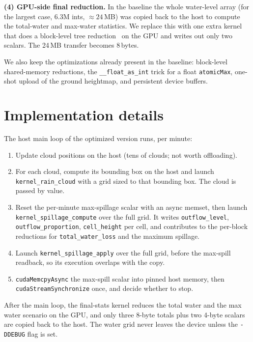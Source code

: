 \documentclass[sigconf, nonacm, review]{acmart}
\begin{document}
\textbf{(4) GPU-side final reduction.} In the baseline the
whole water-level array (for the largest case, 6.3M ints,
$\approx 24$\,MB) was copied back to the host to compute the
total-water and max-water statistics. We replace this with one
extra kernel that does a block-level tree
reduction~\cite{harris2007reduction} on the GPU and writes out
only two scalars. The 24\,MB transfer becomes 8\,bytes.

We also keep the optimizations already present in the baseline:
block-level shared-memory reductions, the
\texttt{\_\_float\_as\_int} trick for a float
\texttt{atomicMax}, one-shot upload of the ground heightmap, and
persistent device buffers.

\section{Implementation details}\label{sec:impl}
The host main loop of the optimized version runs, per minute:

\begin{enumerate}
  \item Update cloud positions on the host (tens of clouds; not
    worth offloading).
  \item For each cloud, compute its bounding box on the host and
    launch \texttt{kernel\_rain\_cloud} with a grid sized to that
    bounding box. The cloud is passed by value.
  \item Reset the per-minute max-spillage scalar with an async
    memset, then launch \texttt{kernel\_spillage\_compute} over the
    full grid. It writes \texttt{outflow\_level},
    \texttt{outflow\_proportion}, \texttt{cell\_height} per cell, and
    contributes to the per-block reductions for
    \texttt{total\_water\_loss} and the maximum spillage.
  \item Launch \texttt{kernel\_spillage\_apply} over the full grid,
    before the max-spill readback, so its execution overlaps
    with the copy.
  \item \texttt{cudaMemcpyAsync} the max-spill scalar into pinned
    host memory, then \texttt{cudaStreamSynchronize} once, and decide
    whether to stop.
\end{enumerate}

After the main loop, the final-stats kernel reduces the total
water and the max water scenario on the GPU, and only three
8-byte totals plus two 4-byte scalars are copied back to the
host. The water grid never leaves the device unless the
\texttt{-DDEBUG} flag is set.
\end{document}
